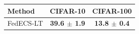 \begin{tabular}{lcc}
\toprule
Method & CIFAR-10 & CIFAR-100\\
\midrule
FedECS-LT & \textbf{39.6 $\pm$ 1.9} & \textbf{13.8 $\pm$ 0.4}\\
\bottomrule
\end{tabular}
